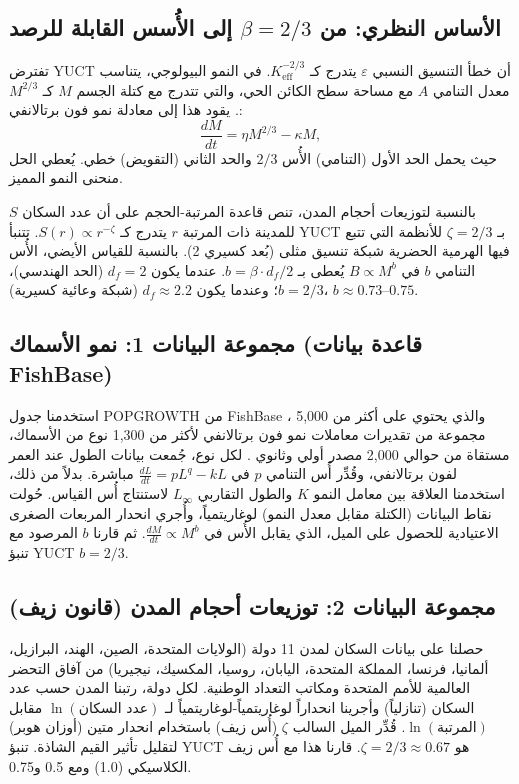 \documentclass[11pt,a4paper]{article}
\newcommand{\eps}{\varepsilon}
\newcommand{\Keff}{K_{\mathrm{eff}}}
\newcommand{\betaf}{\beta}
\newcommand{\df}{d_f}
\begin{document}
	\subsection{الأساس النظري: من \(\beta = 2/3\) إلى الأُسس القابلة للرصد}
	
	تفترض YUCT أن خطأ التنسيق النسبي \(\eps\) يتدرج كـ \(\Keff^{-2/3}\). في النمو البيولوجي، يتناسب معدل التنامي \(A\) مع مساحة سطح الكائن الحي، والتي تتدرج مع كتلة الجسم \(M\) كـ \(M^{2/3}\). يقود هذا إلى معادلة نمو فون برتالانفي:
	\[
	\frac{dM}{dt} = \eta M^{2/3} - \kappa M,
	\]
	حيث يحمل الحد الأول (التنامي) الأُس \(2/3\) والحد الثاني (التقويض) خطي. يُعطي الحل منحنى النمو المميز.
	
	بالنسبة لتوزيعات أحجام المدن، تنص قاعدة المرتبة-الحجم على أن عدد السكان \(S\) للمدينة ذات المرتبة \(r\) يتدرج كـ \(S(r) \propto r^{-\zeta}\). تتنبأ YUCT بـ \(\zeta = 2/3\) للأنظمة التي تتبع فيها الهرمية الحضرية شبكة تنسيق مثلى (بُعد كسيري 2). بالنسبة للقياس الأيضي، الأُس التنامي \(b\) في \(B \propto M^{b}\) يُعطى بـ \(b = \betaf \cdot \df / 2\). عندما يكون \(\df = 2\) (الحد الهندسي)، \(b = 2/3\)؛ وعندما يكون \(\df \approx 2.2\) (شبكة وعائية كسيرية)، \(b \approx 0.73\)–\(0.75\).
	
	\subsection{مجموعة البيانات 1: نمو الأسماك (قاعدة بيانات FishBase)}
	
	استخدمنا جدول POPGROWTH من FishBase \cite{FishBase}، والذي يحتوي على أكثر من 5,000 مجموعة من تقديرات معاملات نمو فون برتالانفي لأكثر من 1,300 نوع من الأسماك، مستقاة من حوالي 2,000 مصدر أولي وثانوي \cite{Pauly1998}. لكل نوع، جُمعت بيانات الطول عند العمر لفون برتالانفي، وقُدِّر أُس التنامي \(p\) في \(\frac{dL}{dt} = p L^{q} - k L\) مباشرة. بدلاً من ذلك، استخدمنا العلاقة بين معامل النمو \(K\) والطول التقاربي \(L_\infty\) لاستنتاج أُس القياس. حُولت نقاط البيانات (الكتلة مقابل معدل النمو) لوغاريتمياً، وأُجري انحدار المربعات الصغرى الاعتيادية للحصول على الميل، الذي يقابل الأُس في \(\frac{dM}{dt} \propto M^{b}\). ثم قارنا \(b\) المرصود مع تنبؤ YUCT \(b = 2/3\).
	
	\subsection{مجموعة البيانات 2: توزيعات أحجام المدن (قانون زيف)}
	
	حصلنا على بيانات السكان لمدن 11 دولة (الولايات المتحدة، الصين، الهند، البرازيل، ألمانيا، فرنسا، المملكة المتحدة، اليابان، روسيا، المكسيك، نيجيريا) من آفاق التحضر العالمية للأمم المتحدة \cite{UN2018} ومكاتب التعداد الوطنية. لكل دولة، رتبنا المدن حسب عدد السكان (تنازلياً) وأجرينا انحداراً لوغاريتمياً-لوغاريتمياً لـ \(\ln(\text{عدد السكان})\) مقابل \(\ln(\text{المرتبة})\). قُدِّر الميل السالب \(\zeta\) (أُس زيف) باستخدام انحدار متين (أوزان هوبر) لتقليل تأثير القيم الشاذة. تنبؤ YUCT هو \(\zeta = 2/3 \approx 0.67\). قارنا هذا مع أُس زيف الكلاسيكي (1.0) ومع 0.5 و0.75.
	
\end{document}
